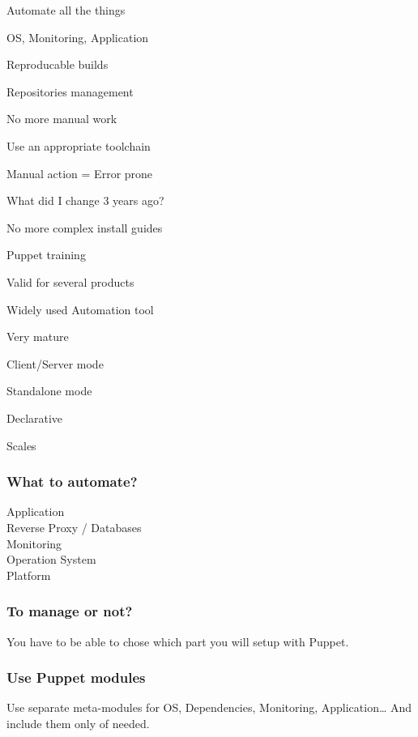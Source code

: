 \begin{iframe}[Automation]
\item Automate all the things
\item OS, Monitoring, Application
\item Reproducable builds
\item Repositories management
\end{iframe}

\begin{iframe}
\item No more manual work
\item Use an appropriate toolchain
\item Manual action = Error prone
\item What did I change 3 years ago?
\end{iframe}

\begin{iframe}[Documentation]
\item No more complex install guides
\item Puppet training
\item Valid for several products
\end{iframe}


\begin{iframe}[Puppet]
\item Widely used Automation tool\pause
\item Very mature\pause
\item Client/Server mode\pause
\item Standalone mode\pause
\item Declarative\pause
\item Scales
\end{iframe}

\begin{frame}
    \frametitle{What to automate?}
    \huge
    Application\\
    Reverse Proxy / Databases\\
    Monitoring\\
    Operation System\\
    Platform
\end{frame}

\begin{frame}
    \frametitle{To manage or not?}
    \huge You have to be able to chose which part you will setup with Puppet.
\end{frame}
\begin{frame}
    \frametitle{Use Puppet modules}
    \huge Use separate meta-modules for OS, Dependencies, Monitoring, Application\dots{} And include them only of needed.
\end{frame}

